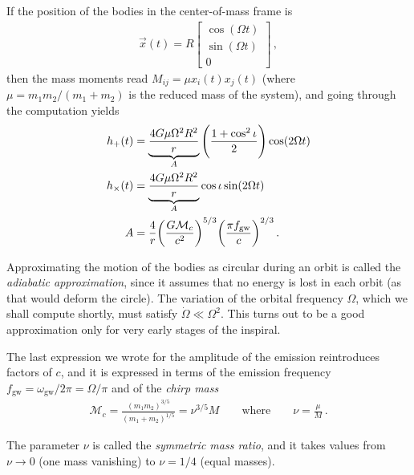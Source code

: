 \documentclass[main.tex]{subfiles}
\begin{document}
If the position of the bodies in the center-of-mass frame is 
%
\begin{subequations}
\begin{align}
\vec{x}(t) = R \left[\begin{array}{c}
\cos(\Omega t) \\ 
\sin(\Omega t) \\ 
0
\end{array}\right]
\,,
\end{align}
\end{subequations}
%
then the mass moments read \(M_{ij} = \mu x_i (t) x_j(t)\) (where \(\mu = m_1 m_2 / (m_1 + m_2 ) \) is the reduced mass of the system), and going through the computation yields \cite[eq.\ 3.332]{maggioreGravitationalWavesVolume2007}
%
\begin{subequations}
\begin{align} \label{eq:binary-waveform-1}
h_{+} (t) &= \underbrace{\frac{4 G \mu \Omega^2 R^2}{r}}_{A} \qty(\frac{1 + \cos^2 \iota }{2}) \cos( 2 \Omega t) 
\\
h_{ \times } (t) &= \underbrace{\frac{4 G \mu \Omega^2 R^2}{r}}_{A} \cos \iota  \sin( 2 \Omega t) 
\\
A &= \frac{4}{r} \qty(\frac{G\mathcal{M}_c}{c^2})^{5/3} \qty(\frac{\pi f _{\text{gw}}}{c})^{2/3} 
\,.
\end{align}
\end{subequations}

Approximating the motion of the bodies as circular during an orbit is called the \emph{adiabatic approximation}, since it assumes that no energy is lost in each orbit (as that would deform the circle). The variation of the orbital frequency \(\Omega \), which we shall compute shortly, must satisfy \(\dot{\Omega} \ll \Omega^2\). 
This turns out to be a good approximation only for very early stages of the inspiral. 

The last expression we wrote for the amplitude of the emission reintroduces factors of \(c\), and it is expressed in terms of the emission frequency \(f _{\text{gw}} = \omega _{\text{gw}} / 2 \pi = \Omega / \pi \) and of the \emph{chirp mass}
%
\begin{align} \label{eq:chirp-mass}
\mathcal{M}_c = \frac{(m_1 m_2 )^{3/5}}{(m_1 + m_2 )^{1/5}} = \nu^{3/5} M 
\qquad \text{where} \qquad
\nu = \frac{\mu}{M}
\,.
\end{align}

The parameter \(\nu \) is called the \emph{symmetric mass ratio}, and it takes values from \(\nu \to 0\) (one mass vanishing) to \(\nu = 1/4\) (equal masses).
\end{document}
